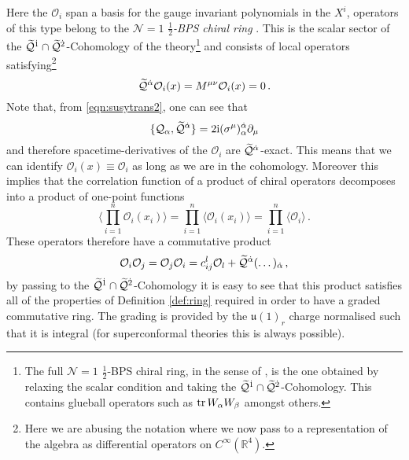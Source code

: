 \documentclass[main.tex]{subfiles}
\begin{document}
Here the $\mathcal{O}_i$ span a basis for the gauge invariant polynomials in the $X^i$, operators of this type belong to the $\mathcal{N}=1$ \textit{$\frac{1}{2}$-BPS chiral ring} \cite{Cachazo:2002ry}.  This is the scalar sector of the $\widetilde{\mathcal{Q}}^{\dot1}\cap \widetilde{\mathcal{Q}}^{\dot2}$-Cohomology of the theory\footnote{The full $\mathcal{N}=1$ $\frac{1}{2}$-BPS chiral ring, in the sense of \cite{Cachazo:2002ry}, is the one obtained by relaxing the scalar condition and taking the $\widetilde{\mathcal{Q}}^{\dot1}\cap \widetilde{\mathcal{Q}}^{\dot2}$-Cohomology.  This contains glueball operators such as $\operatorname{tr} W_{\alpha}W_{\beta}$ amongst others.} and consists of local operators satisfying\footnote{Here we are abusing the notation where we now pass to a representation of the algebra as differential operators on $C^{\infty}(\mathbb{R}^{4})$.}
\begin{equation}
\widetilde{\mathcal{Q}}^{\dot\alpha}\mathcal{O}_i(x)= M^{\mu\nu}\mathcal{O}_i(x)=0\,.
\end{equation}
Note that, from \eqref{eqn:susytrans2}, one can see that 
\begin{equation}
\{\mathcal{Q}_{\alpha},\widetilde{\mathcal{Q}}^{\dot\alpha}\}=2\mathrm{i}(\sigma^{\mu})^{\dot\alpha}_{\alpha}\partial_\mu
\end{equation}
and therefore spacetime-derivatives of the $\mathcal{O}_i$ are $\widetilde{\mathcal{Q}}^{\dot\alpha}$-exact.  This means that we can identify $\mathcal{O}_i(x)\equiv \mathcal{O}_i$ as long as we are in the cohomology.  Moreover this implies that the correlation function of a product of chiral operators decomposes into a product of one-point functions
\begin{equation}
\langle\prod_{i=1}^n\mathcal{O}_i(x_i)\rangle=\prod_{i=1}^n\langle\mathcal{O}_i(x_i)\rangle=\prod_{i=1}^n\langle\mathcal{O}_i\rangle\,.
\end{equation}
These operators therefore have a commutative product
\begin{equation}
\mathcal{O}_i\mathcal{O}_j=\mathcal{O}_j\mathcal{O}_i=c_{ij}^l\mathcal{O}_l+\widetilde{\mathcal{Q}}^{\dot\alpha}(\dots)_{\dot\alpha}\,,
\end{equation}
by passing to the $\widetilde{\mathcal{Q}}^{\dot1}\cap\widetilde{\mathcal{Q}}^{\dot2}$-Cohomology it is easy to see that this product satisfies all of the properties of Definition \ref{def:ring} required in order to have a graded commutative ring.  The grading is provided by the $\mathfrak{u}(1)_r$ charge normalised such that it is integral (for superconformal theories this is always possible).
\end{document}
